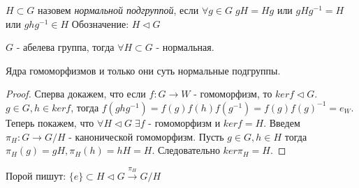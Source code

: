 \begin{defn}
  $H \subset G$ назовем \emph{нормальной подгруппой}, если $ \forall g \in G \; gH = Hg $ или $ gHg^{-1} = H $ или $ ghg^{-1} \in H $  
  \newline Обозначение: $H \triangleleft G$
\end{defn}

\begin{thm}
  $ G $ - абелева группа, тогда $ \forall H \subset G $ - нормальная.
\end{thm}

\pagebreak

\begin{thm}
  Ядра гомоморфизмов и только они суть нормальные подгруппы.
\end{thm}
\begin{proof}
  Сперва докажем, что если $ f: G \rightarrow W $ - гомоморфизм, то $ ker f \triangleleft G $. 
  $ g \in G, h \in ker f $, тогда $ f(ghg^{-1}) = f(g)f(h)f(g^{-1}) = f(g)f(g)^{-1} = e_W $. \newline
  Теперь покажем, что $ \forall H \triangleleft G \; \exists f $ - гомоморфизм и $ ker f = H $.
  Введем $ \pi_{H} : G \rightarrow G/H $ - канонической гомоморфизм. Пусть $ g \in G, h \in H $ 
  тогда $\pi_{H}(g) = gH, \pi_{H}(h) = hH = H $. Следовательно $ ker \pi_{H} = H $.
\end{proof}

Порой пишут: $ \{e\} \subset H \triangleleft G \overset{\pi_{H}}{\rightarrow} G/H $ 





